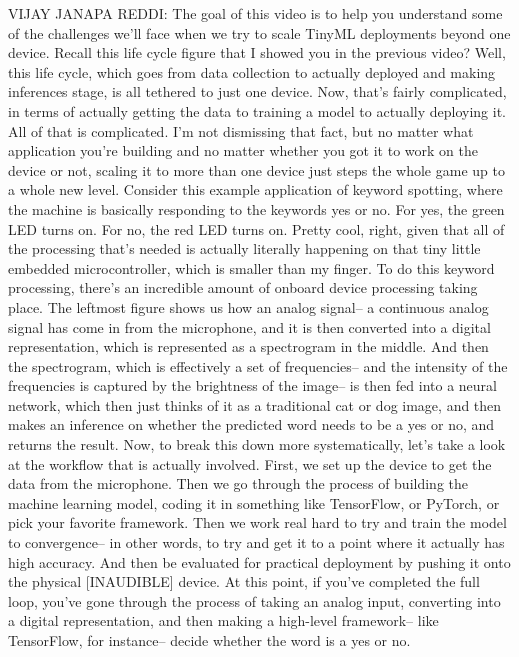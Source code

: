 VIJAY JANAPA REDDI: The goal of this video
is to help you understand some of the challenges we'll
face when we try to scale TinyML deployments beyond one device.
Recall this life cycle figure that I showed you in the previous video?
Well, this life cycle, which goes from data collection to actually deployed
and making inferences stage, is all tethered to just one device.
Now, that's fairly complicated, in terms of actually getting
the data to training a model to actually deploying it.
All of that is complicated.
I'm not dismissing that fact, but no matter what application you're building
and no matter whether you got it to work on the device or not,
scaling it to more than one device just steps the whole game up
to a whole new level.
Consider this example application of keyword spotting, where
the machine is basically responding to the keywords yes or no.
For yes, the green LED turns on.
For no, the red LED turns on.
Pretty cool, right, given that all of the processing that's needed
is actually literally happening on that tiny little embedded microcontroller,
which is smaller than my finger.
To do this keyword processing, there's an incredible amount of onboard device
processing taking place.
The leftmost figure shows us how an analog signal--
a continuous analog signal has come in from the microphone,
and it is then converted into a digital representation, which is represented
as a spectrogram in the middle.
And then the spectrogram, which is effectively a set of frequencies--
and the intensity of the frequencies is captured by the brightness
of the image--
is then fed into a neural network, which then just thinks
of it as a traditional cat or dog image, and then makes
an inference on whether the predicted word needs to be a yes or no,
and returns the result.
Now, to break this down more systematically,
let's take a look at the workflow that is actually involved.
First, we set up the device to get the data from the microphone.
Then we go through the process of building the machine learning model,
coding it in something like TensorFlow, or PyTorch,
or pick your favorite framework.
Then we work real hard to try and train the model to convergence--
in other words, to try and get it to a point
where it actually has high accuracy.
And then be evaluated for practical deployment
by pushing it onto the physical [INAUDIBLE] device.
At this point, if you've completed the full loop,
you've gone through the process of taking an analog input,
converting into a digital representation,
and then making a high-level framework-- like TensorFlow, for instance--
decide whether the word is a yes or no.
